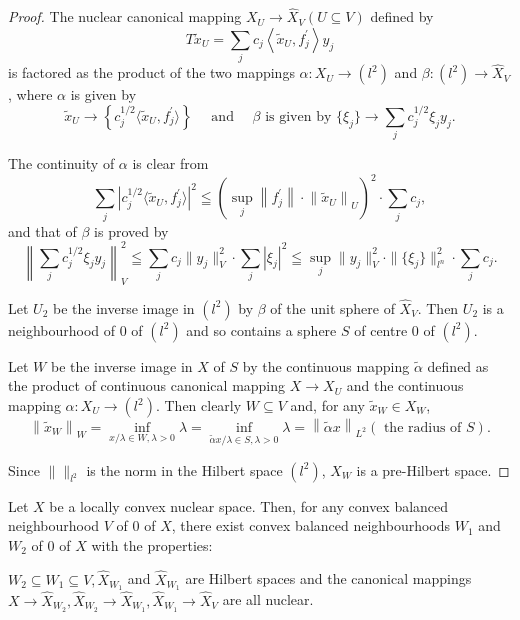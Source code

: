 \begin{proof}
 The nuclear canonical mapping $X_{U} \to \hat{X}_{V} (U \subseteq V)$ defined by 
\[
T \tilde {x} _{U} = \sum\limits_{j} c _{j} \left\langle \tilde {x} _{U}, f _{j} ^{\prime} \right\rangle y _{j}
\]
is factored as the product of the two mappings 
$\alpha : X_U \to (l^2)$ and $\beta : (l^2) \to \hat{X}_V$, where $\alpha$ is given by 
\[
\tilde {x} _{U} \rightarrow \left\{c _{j} ^{1/2} \langle \tilde {x} _{U}, f _{j} ^{\prime} \rangle \right\} \quad \text{ and } \quad \beta \text{ is given by } \{\xi_{j} \} \rightarrow \sum\limits_{j} c _{j} ^{1/2} \xi_{j} y _{j}. \]

The continuity of $\alpha$ is clear from 
\[
\sum\limits_{j} \left| c _{j} ^{1/2} \langle \tilde {x} _{U}, f _{j} ^{\prime} \rangle \right| ^{2} \leqq \left(\sup\limits _{j} \left\| f _{j} ^{\prime} \right\| \cdot \left\| \tilde {x} _{U} \right\| _{U}\right) ^{2} \cdot \sum\limits_{j} c _{j},
\]
and that of $\beta$ is proved by 
\[
\left\| \sum\limits_{j} c _{j} ^{1/2} \xi_{j} y _{j} \right\| _{V} ^{2} \leqq \sum\limits_{j} c _{j} \| y _{j} \| _{V} ^{2} \cdot \sum\limits_{j} | \xi_{j} | ^{2} \leqq \sup\limits _{j} \| y _{j} \| _{V} ^{2} \cdot \| \{\xi_{j} \} \| _ {l ^{n}} ^{2} \cdot \sum\limits_{j} c _{j}.
\]

Let $U_{2}$ be the inverse image in $(l^{2})$ by $\beta$ of the unit sphere of $\hat{X}_{V}$. Then $U_{2}$ is a neighbourhood of $0$ of $(l^{2})$ and so contains a sphere $S$ of centre $0$ of $(l^{2})$. 

Let $W$ be the inverse image in $X$ of $S$ by the continuous mapping $\tilde{\alpha}$ defined as the product of continuous canonical mapping $X \to X_U$ and the continuous mapping $\alpha: X_U \to (l^2)$. Then clearly $W \subseteq V$ and, for any $\tilde{x}_W \in X_W$, 
\[
\left\| \tilde {x} _{W} \right\| _{W} = \inf\limits _{x / \lambda \in W, \lambda > 0} \lambda = \inf\limits _ {\tilde {\alpha} x / \lambda \in S, \lambda > 0} \lambda = \left\| \tilde {\alpha} x \right\| _ {L ^{2}} (\text{ the radius of } S).
\]

Since $\|\|_{l^2}$ is the norm in the Hilbert space $(l^2)$, $X_W$ is a pre-Hilbert space. 
\end{proof}

\begin{corollaryu} Let $X$ be a locally convex nuclear space. Then, for any convex balanced neighbourhood $V$ of $0$ of $X$, there exist convex balanced neighbourhoods $W_{1}$ and $W_{2}$ of $0$ of $X$ with the properties: 

$W_{2} \subseteq W_{1} \subseteq V, \hat{X}_{W_{1}}$ and $\hat{X}_{W_{1}}$ are Hilbert spaces and the canonical 
mappings $X \to \hat{X}_{W_2}, \hat{X}_{W_2} \to \hat{X}_{W_1}, \hat{X}_{W_1} \to \hat{X}_V$ are all nuclear. 
\end{corollaryu}

